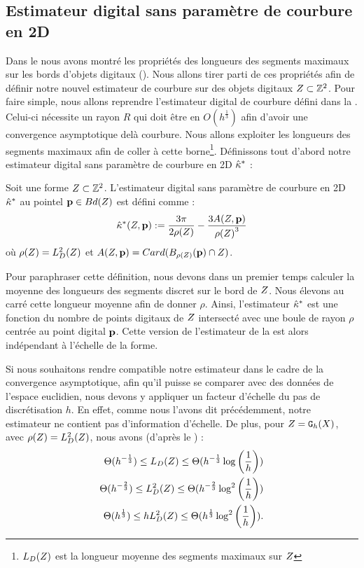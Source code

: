 \subsection{Estimateur digital sans paramètre de courbure en 2D}
%
Dans le  nous avons montré les propriétés des longueurs
des segments maximaux sur les bords d'objets digitaux
(). Nous allons tirer parti de ces propriétés afin
de définir notre nouvel estimateur de courbure sur des objets digitaux
$Z \subset \mathbb{Z}^2$. Pour faire simple, nous allons reprendre l'estimateur
digital de courbure défini dans la .
Celui-ci nécessite un rayon $R$ qui doit être en $O(h^{\frac{1}{3}})$ afin
d'avoir une convergence asymptotique delà courbure. Nous allons exploiter les
longueurs des segments maximaux afin de coller à cette
borne\footnote{$L_D({Z})$ est la longueur moyenne des segments maximaux
sur $Z$}. Définissons tout d'abord notre estimateur digital sans
paramètre de courbure en 2D $\hat{\kappa}^{*}$ :
%
\begin{definition}
  \label{def:curvature-estimator-2d-pf}
  Soit une forme $Z \subset \mathbb{Z}^2$. L'estimateur digital sans paramètre
  de courbure en 2D $\hat{\kappa}^{*}$ au pointel $\mathbf{p} \in Bd({Z})$ est défini comme :
  \begin{equation}
    \hat{\kappa}^{*}( Z, \mathbf{p}) := \frac{3\pi}{2 \rho(Z)} - \frac{3 A(Z,\mathbf{p})}{{\rho(Z)}^3}
  \end{equation}
  où $\rho(Z) =L_D^2(Z)$ et $A(Z,\mathbf{p}) =
  Card(B_{\rho(Z)}(\mathbf{p}) \cap Z)$.
\end{definition}
%
Pour paraphraser cette définition, nous devons dans un premier temps calculer la
moyenne des longueurs des segments discret sur le bord de $Z$. Nous
élevons au carré cette longueur moyenne afin de donner $\rho$. Ainsi,
l'estimateur $\hat{\kappa}^{*}$ est une fonction du nombre de points digitaux de
$Z$ intersecté avec une boule de rayon $\rho$ centrée au point digital
$\mathbf{p}$. Cette version de l'estimateur de la
 est alors indépendant à l’échelle de la
forme.


Si nous souhaitons rendre compatible notre estimateur dans le cadre de la
convergence asymptotique, afin qu'il puisse se comparer avec des données de
l'espace euclidien, nous devons y appliquer un facteur d'échelle du pas de
discrétisation $h$. En effet, comme nous l'avons dit précédemment, notre
estimateur ne contient pas d'information d'échelle. De plus, pour $Z =
\mathtt{G}_{h}(X)$, avec $\rho(Z) = L^2_D(Z)$, nous avons (d'après le
) :
%
\begin{align}
  \Theta(h^{-\frac{1}{3}}) \le L_D( Z ) \le \Theta(h^{-\frac{1}{3}} \log \left(\frac{1}{h}\right)) \\
  \Theta(h^{-\frac{2}{3}}) \le L^2_D( Z ) \le \Theta(h^{-\frac{2}{3}} \log^2 \left(\frac{1}{h}\right)) \\
  \Theta(h^{\frac{1}{3}}) \le hL^2_D( Z ) \le \Theta(h^{\frac{1}{3}} \log^2 \left(\frac{1}{h}\right)) \label{eq:bounds-length-MDSS}.
\end{align}
%


